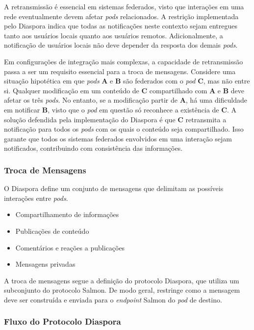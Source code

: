 A retransmissão é essencial em sistemas federados, visto que interações em uma rede
eventualmente devem afetar \textit{pods} relacionados. A restrição implementada pelo
Diaspora indica que todas as notificações neste contexto sejam entregues tanto aos
usuários locais quanto aos usuários remotos. Adicionalmente, a notificação de
usuários locais não deve depender da resposta dos demais \textit{pods}.

Em configurações de integração mais complexas, a capacidade de retransmissão passa a
ser um requisito essencial para a troca de mensagens. Considere uma situação
hipotética em que \textit{pods} \textbf{A} e \textbf{B} são federados com o
\textit{pod} \textbf{C}, mas não entre si. Qualquer modificação em um conteúdo de
\textbf{C} compartilhado com \textbf{A} e \textbf{B} deve afetar os três
\textit{pods}. No entanto, se a modificação partir de \textbf{A}, há uma dificuldade
em notificar \textbf{B}, visto que o \textit{pod} em questão só reconhece a
existência de \textbf{C}. A solução defendida pela implementação do Diaspora é que
\textbf{C} retransmita a notificação para todos os \textit{pods} com os quais o
conteúdo seja compartilhado. Isso garante que todos os sistemas federados envolvidos
em uma interação sejam notificados, contribuindo com consistência das informações.

\subsubsection{Troca de Mensagens}

O Diaspora define um conjunto de mensagens que delimitam as possíveis interações
entre \textit{pods}.

\begin{itemize}
  \item{Compartilhamento de informações}
  \item{Publicações de conteúdo}
  \item{Comentários e reações a publicações}
  \item{Mensagens privadas}
\end{itemize}

A troca de mensagens segue a definição do protocolo Diaspora, que utiliza um
subconjunto do protocolo Salmon. De modo geral, restringe como a mensagem deve ser
construída e enviada para o \textit{endpoint} Salmon do \textit{pod} de destino. 

\subsubsection{Fluxo do Protocolo Diaspora}

